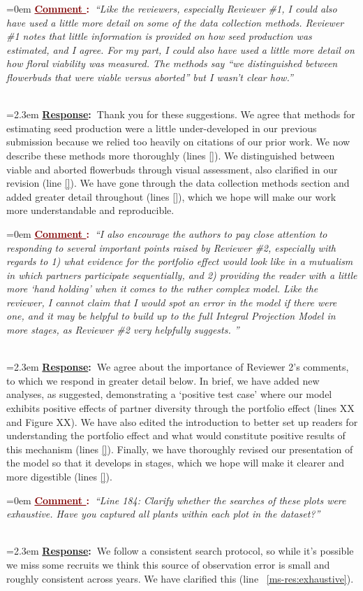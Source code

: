 \documentclass[12pt]{article}
\newcounter{cN}
\newcommand{\comment}[1]{
	\vspace{2em}
	\refstepcounter{cN} %
	\noindent \hangindent=0em \textbf{\textcolor{Maroon}{\uline{Comment \thecN}:~}}\emph{``#1''}
	}
\newcommand{\response}[1]{
	\\[0.25em]
	\hangindent=2.3em \textbf{\textcolor{NavyBlue}{\uline{Response}:~}}#1
	}
\begin{document}
\comment{Like the reviewers, especially Reviewer \#1, I could also have used a little more detail on some of the data collection methods. Reviewer \#1 notes that little information is provided on how seed production was estimated, and I agree. For my part, I could also have used a little more detail on how floral viability was measured. The methods say “we distinguished between flowerbuds that were viable versus aborted” but I wasn’t clear how.}
\response{Thank you for these suggestions. 
	We agree that methods for estimating seed production were a little under-developed in our previous submission because we relied too heavily on citations of our prior work. 
	We now describe these methods more thoroughly (lines \ref{}). 
	We distinguished between viable and aborted flowerbuds through visual assessment, also clarified in our revision (line \ref{}). 
	We have gone through the data collection methods section and added greater detail throughout (lines \ref{}), which we hope will make our work more understandable and reproducible.}

\comment{I also encourage the authors to pay close attention to responding to several important points raised by Reviewer \#2, especially with regards to 1) what evidence for the portfolio effect would look like in a mutualism in which partners participate sequentially, and 2) providing the reader with a little more ‘hand holding’ when it comes to the rather complex model. Like the reviewer, I cannot claim that I would spot an error in the model if there were one, and it may be helpful to build up to the full Integral Projection Model in more stages, as Reviewer \#2 very helpfully suggests. }
\response{We agree about the importance of Reviewer 2's comments, to which we respond in greater detail below. 
	In brief, we have added new analyses, as suggested, demonstrating a `positive test case' where our model exhibits positive effects of partner diversity through the portfolio effect (lines XX and Figure XX). 
	We have also edited the introduction to better set up readers for understanding the portfolio effect and what would constitute positive results of this mechanism (lines \ref{}). 
	Finally, we have thoroughly revised our presentation of the model so that it develops in stages, which we hope will make it clearer and more digestible (lines \ref{}). }

\comment{Line 184: Clarify whether the searches of these plots were exhaustive. Have you captured all plants within each plot in the dataset?}
\response{We follow a consistent search protocol, so while it's possible we miss some recruits we think this source of observation error is small and roughly consistent across years.  We have clarified this (line ~\ref{ms-res:exhaustive}).}
\end{document}
